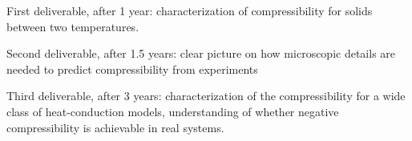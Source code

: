 \begin{workpackage}[id=WPcompress,wphases=0-36,
  short=Nonequilibrium compressibility, %
  title=Nonequilibrium compressibility, %
  lead=Padova,
  PadovaRM=36]
\begin{tasklist}
\begin{task}[title=TASK3,id=task3,PM=6,lead=Padova,wphases={12-18!0.5,18-36!1}]
  \end{task}



\end{tasklist}

\begin{wpdelivs}
  \begin{wpdeliv}[due=12,id=mydeliv1,dissem=PU,nature=DEM,lead=Padova]
      {First deliverable, after 1 year: characterization of compressibility for solids between two temperatures.}
  \end{wpdeliv}
  \begin{wpdeliv}[due=18,id=mydeliv2,dissem=PU,nature=DEM,lead=Padova]
      {Second deliverable, after 1.5 years: clear picture on how microscopic details are needed to predict compressibility from experiments}
\end{wpdeliv}
  \begin{wpdeliv}[due=36,id=mydeliv3,dissem=PU,nature=DEM,lead=Padova]
      {Third deliverable, after 3 years: characterization of the compressibility for a wide class of heat-conduction models, understanding of whether negative compressibility is achievable in real systems.}
\end{wpdeliv}
\end{wpdelivs}




\end{workpackage}
